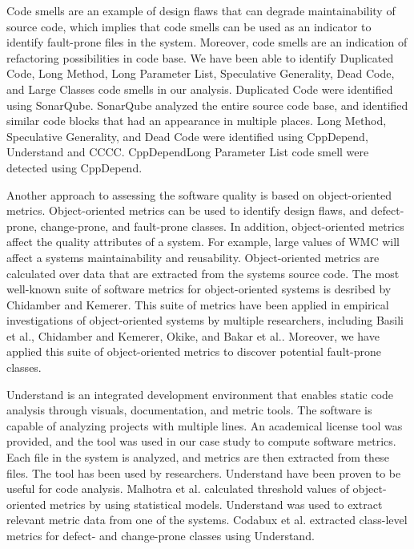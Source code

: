 Code smells are an example of design flaws that can degrade maintainability of source code, which implies that code smells can be used as an indicator to identify fault-prone files in the system. Moreover, code smells are an indication of refactoring possibilities in code base. We have been able to identify Duplicated Code, Long Method, Long Parameter List, Speculative Generality, Dead Code, and Large Classes code smells in our analysis. Duplicated Code were identified using SonarQube. SonarQube analyzed the entire source code base, and identified similar code blocks that had an appearance in multiple places. Long Method, Speculative Generality, and Dead Code were identified using CppDepend, Understand and CCCC. CppDependLong Parameter List code smell were detected using CppDepend.

Another approach to assessing the software quality is based on object-oriented metrics\cite{codabux2016technical}. Object-oriented metrics can be used to identify design flaws, and defect-prone, change-prone, and fault-prone classes. In addition, object-oriented metrics affect the quality attributes of a system. For example, large values of WMC will affect a systems maintainability and reusability\cite{quenelobject}. Object-oriented metrics are calculated over data that are extracted from the systems source code. The most well-known suite of software metrics for object-oriented systems is desribed by Chidamber and Kemerer. This suite of metrics have been applied in empirical investigations of object-oriented systems by multiple researchers, including Basili et al.\cite{basili1996validation}, Chidamber and Kemerer\cite{chidamber1994metrics}, Okike\cite{okike2010pedagogical}, and Bakar et al.\cite{bakar2014analysis}. Moreover, we have applied this suite of object-oriented metrics to discover potential fault-prone classes.

Understand is an integrated development environment that enables static code analysis through visuals, documentation, and metric tools. The software is capable of analyzing projects with multiple lines. An academical license tool was provided, and the tool was used in our case study to compute software metrics. Each file in the system is analyzed, and metrics are then extracted from these files. The tool has been used by researchers. Understand have been proven to be useful for code analysis. Malhotra et al.\cite{malhotra2015fault} calculated threshold values of object-oriented metrics by using statistical models. Understand was used to extract relevant metric data from one of the systems. Codabux et al.\cite{codabux2016technical} extracted class-level metrics for defect- and change-prone classes using Understand.

